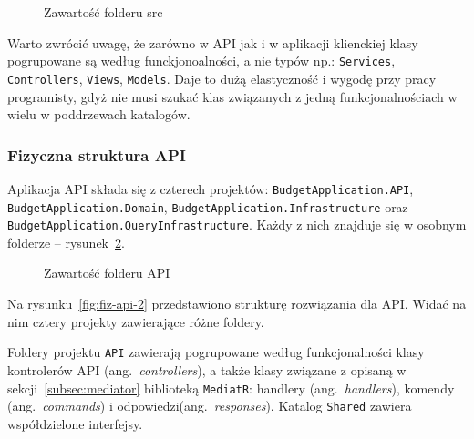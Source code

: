 \begin{figure}[t]
	\centering
	\caption{Zawartość folderu src}
	\label{fig:fiz-2}
\end{figure}

Warto zwrócić uwagę, że zarówno w API jak i w aplikacji klienckiej klasy pogrupowane są według funckjonoalności, a nie typów np.: \texttt{Services}, \texttt{Controllers}, \texttt{Views}, \texttt{Models}. Daje to dużą elastyczność i wygodę przy pracy programisty, gdyż nie musi szukać klas związanych z jedną funkcjonalnościach w wielu w poddrzewach katalogów.

\subsubsection{Fizyczna struktura API}

Aplikacja API składa się z czterech projektów: \texttt{BudgetApplication.API}, \texttt{BudgetApplication.Domain}, \texttt{BudgetApplication.Infrastructure} oraz \texttt{BudgetApplication.QueryInfrastructure}. Każdy z nich znajduje się w osobnym folderze -- rysunek~\ref{fig:fiz-api-1}.

\begin{figure}[t]
	\centering
	\caption{Zawartość folderu API}
	\label{fig:fiz-api-1}
\end{figure}

Na rysunku~\ref{fig:fiz-api-2} przedstawiono strukturę rozwiązania dla API. Widać na nim cztery projekty zawierające różne foldery. 

Foldery projektu \texttt{API} zawierają pogrupowane według funkcjonalności klasy kontrolerów API (ang.~\emph{controllers}), a także klasy związane z opisaną w sekcji~\ref{subsec:mediator} biblioteką \texttt{MediatR}: handlery (ang.~\emph{handlers}), komendy (ang.~\emph{commands}) i odpowiedzi(ang.~\emph{responses}). Katalog \texttt{Shared} zawiera współdzielone interfejsy. 

